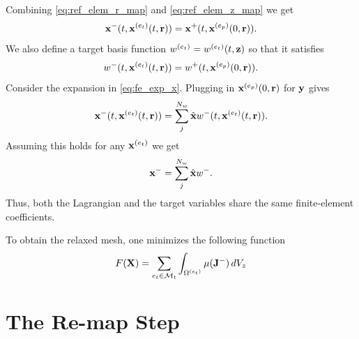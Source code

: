\documentclass[11pt]{report}
\begin{document}
Combining \cref{eq:ref_elem_r_map} and \cref{eq:ref_elem_z_map} we get
\begin{equation}
    \mathbf{x}^-(t,\mathbf{x}^{(e_t)}(t,\mathbf{r})) = \mathbf{x}^+(t, \mathbf{x}^{(e_p)}(0,\mathbf{r})).
\end{equation}
We also define a target basis function $w^{(e_t)} = w^{(e_t)}(t,\mathbf{z})$ so that it satisfies
\begin{equation}
    w^-(t,\mathbf{x}^{(e_t)}(t,\mathbf{r})) = w^+(t, \mathbf{x}^{(e_p)}(0,\mathbf{r})).
\end{equation}
Consider the expansion in \cref{eq:fe_exp_x}. Plugging in $\mathbf{x}^{(e_p)}(0,\mathbf{r})$ for $\mathbf{y}$ gives
\begin{equation}
    \mathbf{x}^-(t,\mathbf{x}^{(e_t)}(t,\mathbf{r})) = \sum_j^{N_w} \hat{\mathbf{x}} w^-(t,\mathbf{x}^{(e_t)}(t,\mathbf{r})).
\end{equation}
Assuming this holds for any $\mathbf{x}^{(e_t)}$ we get
\begin{equation}
    \mathbf{x}^- = \sum_j^{N_w} \hat{\mathbf{x}} w^-.
\end{equation}
Thus, both the Lagrangian and the target variables share the same finite-element coefficients.

To obtain the relaxed mesh, one minimizes the following function
\begin{equation}
    F(\mathbf{X}) = \sum_{e_t \in \mathcal{M}_t} \int_{\Omega^{(e_t)}} \mu( \mathbf{J}^- ) \, dV_z
\end{equation}

\chapter{The Re-map Step}



\end{document}
